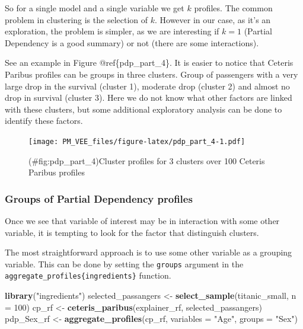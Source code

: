 \documentclass[]{krantz}
\newenvironment{Shaded}{\begin{snugshade}}{\end{snugshade}}
\newcommand{\DataTypeTok}[1]{\textcolor[rgb]{0.13,0.29,0.53}{#1}}
\newcommand{\DecValTok}[1]{\textcolor[rgb]{0.00,0.00,0.81}{#1}}
\newcommand{\KeywordTok}[1]{\textcolor[rgb]{0.13,0.29,0.53}{\textbf{#1}}}
\newcommand{\NormalTok}[1]{#1}
\newcommand{\StringTok}[1]{\textcolor[rgb]{0.31,0.60,0.02}{#1}}
\theoremstyle{definition}
\theoremstyle{definition}
\theoremstyle{definition}
\theoremstyle{remark}
\begin{document}
So for a single model and a single variable we get \(k\) profiles. The
common problem in clustering is the selection of \(k\). However in our
case, as it's an exploration, the problem is simpler, as we are
interesting if \(k=1\) (Partial Dependency is a good summary) or not
(there are some interactions).

See an example in Figure @ref\{pdp\_part\_4\}. It is easier to notice
that Ceteris Paribus profiles can be groups in three clusters. Group of
passengers with a very large drop in the survival (cluster 1), moderate
drop (cluster 2) and almost no drop in survival (cluster 3). Here we do
not know what other factors are linked with these clusters, but some
additional exploratory analysis can be done to identify these factors.

\begin{figure}
\centering
\texttt{[image: PM\_VEE\_files/figure-latex/pdp\_part\_4-1.pdf]}
\caption{(\#fig:pdp\_part\_4)Cluster profiles for 3 clusters over 100
Ceteris Paribus profiles}
\end{figure}

\hypertarget{groups-of-partial-dependency-profiles}{%
\subsubsection{Groups of Partial Dependency
profiles}\label{groups-of-partial-dependency-profiles}}

Once we see that variable of interest may be in interaction with some
other variable, it is tempting to look for the factor that distinguish
clusters.

The most straightforward approach is to use some other variable as a
grouping variable. This can be done by setting the \texttt{groups}
argument in the \texttt{aggregate\_profiles\{ingredients\}} function.

\begin{Shaded}
\begin{Highlighting}[]
\KeywordTok{library}\NormalTok{(}\StringTok{"ingredients"}\NormalTok{)}
\NormalTok{selected_passangers <-}\StringTok{ }\KeywordTok{select_sample}\NormalTok{(titanic_small, }\DataTypeTok{n =} \DecValTok{100}\NormalTok{)}
\NormalTok{cp_rf <-}\StringTok{ }\KeywordTok{ceteris_paribus}\NormalTok{(explainer_rf, selected_passangers)}
\NormalTok{pdp_Sex_rf <-}\StringTok{ }\KeywordTok{aggregate_profiles}\NormalTok{(cp_rf, }\DataTypeTok{variables =} \StringTok{"Age"}\NormalTok{,}
                \DataTypeTok{groups =} \StringTok{"Sex"}\NormalTok{)}
\end{Highlighting}
\end{Shaded}
\end{document}
